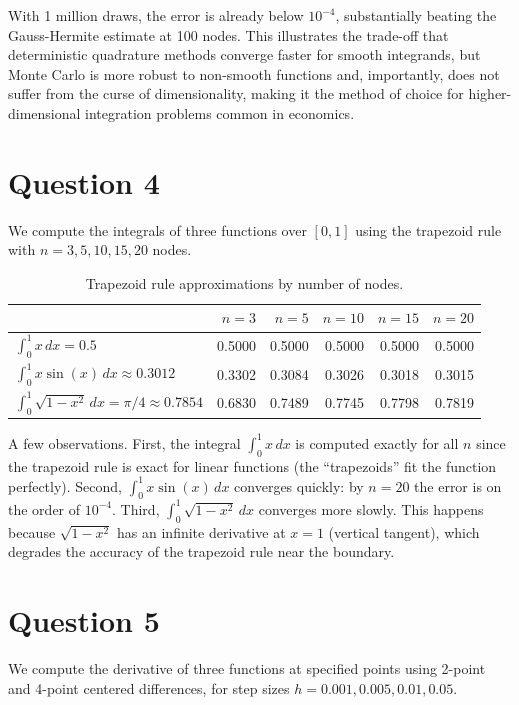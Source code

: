 \documentclass{article}
\begin{document}
With 1 million draws, the error is already below $10^{-4}$, substantially beating the Gauss-Hermite estimate at 100 nodes. This illustrates the trade-off that deterministic quadrature methods converge faster for smooth integrands, but Monte Carlo is more robust to non-smooth functions and, importantly, does not suffer from the curse of dimensionality, making it the method of choice for higher-dimensional integration problems common in economics.


\section{Question 4}
\label{sec:q4}

We compute the integrals of three functions over $[0,1]$ using the trapezoid rule with $n = 3, 5, 10, 15, 20$ nodes.

\begin{table}[h!]
\centering
\begin{tabular}{lrrrrr}
    \toprule
    & $n=3$ & $n=5$ & $n=10$ & $n=15$ & $n=20$ \\
    \midrule
    $\int_0^1 x \, dx = 0.5$ & 0.5000 & 0.5000 & 0.5000 & 0.5000 & 0.5000 \\
    $\int_0^1 x\sin(x) \, dx \approx 0.3012$ & 0.3302 & 0.3084 & 0.3026 & 0.3018 & 0.3015 \\
    $\int_0^1 \sqrt{1-x^2} \, dx = \pi/4 \approx 0.7854$  & 0.6830 & 0.7489 & 0.7745 & 0.7798 & 0.7819 \\
    \bottomrule
\end{tabular}
\caption{Trapezoid rule approximations by number of nodes.}
\label{tab:q4}
\end{table}

A few observations. First, the integral $\int_0^1 x \, dx$ is computed exactly for all $n$ since the trapezoid rule is exact for linear functions (the ``trapezoids'' fit the function perfectly). Second, $\int_0^1 x\sin(x) \, dx$ converges quickly: by $n = 20$ the error is on the order of $10^{-4}$. Third, $\int_0^1 \sqrt{1-x^2} \, dx$ converges more slowly. This happens because $\sqrt{1-x^2}$ has an infinite derivative at $x = 1$ (vertical tangent), which degrades the accuracy of the trapezoid rule near the boundary.


\section{Question 5}
\label{sec:q5}

We compute the derivative of three functions at specified points using 2-point and 4-point centered differences, for step sizes $h = 0.001, 0.005, 0.01, 0.05$.
\end{document}
